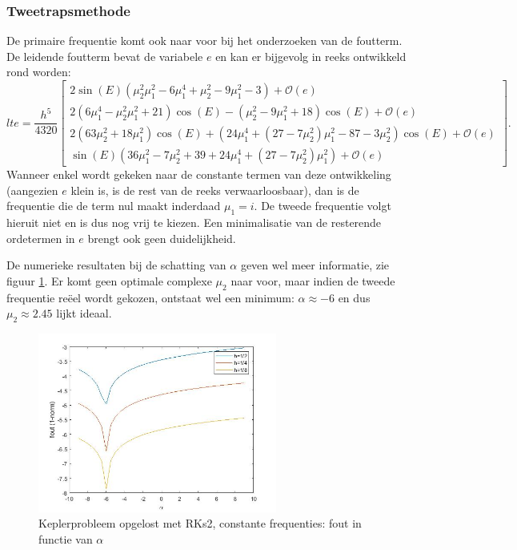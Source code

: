 \documentclass[12pt]{article}
\begin{document}
\subsubsection{Tweetrapsmethode}
De primaire frequentie komt ook naar voor bij het onderzoeken van de foutterm. De leidende foutterm bevat de variabele \(e\) en kan er bijgevolg in reeks ontwikkeld rond worden:
\begin{equation*}
    lte=\frac{h^5}{4320}
    \begin{bmatrix}
        2\sin(E)(\mu_2^2\mu_1^2-6\mu_1^4+\mu_2^2-9\mu_1^2-3)+\mathcal{O}(e) \\
        2(6\mu_1^4-\mu_2^2\mu_1^2+21)\cos(E)-(\mu_2^2-9\mu_1^2+18)\cos(E)+\mathcal{O}(e) \\
        2(63\mu_2^2+18\mu_1^2)\cos(E)+(24\mu_1^4+(27-7\mu_2^2)\mu_1^2-87-3\mu_2^2)\cos(E)+\mathcal{O}(e) \\
        \sin(E)(36\mu_1^2-7\mu_2^2+39+24\mu_1^4+(27-7\mu_2^2)\mu_1^2)+\mathcal{O}(e)
    \end{bmatrix}.
\end{equation*}
Wanneer enkel wordt gekeken naar de constante termen van deze ontwikkeling (aangezien \(e\) klein is, is de rest van de reeks verwaarloosbaar), dan is de frequentie die de term nul maakt inderdaad \(\mu_1=i\). De tweede frequentie volgt hieruit niet en is dus nog vrij te kiezen. Een minimalisatie van de resterende ordetermen in \(e\) brengt ook geen duidelijkheid. 

De numerieke resultaten bij de schatting van \(\alpha\) geven wel meer informatie, zie figuur \ref{fig:conskepleralphasrks2}. Er komt geen optimale complexe \(\mu_2\) naar voor, maar indien de tweede frequentie reëel wordt gekozen, ontstaat wel een minimum: \(\alpha\approx-6\) en dus \(\mu_2\approx2.45\) lijkt ideaal.
\begin{figure}[H]
    \centering
    \includegraphics[width=0.7\textwidth]{kepler_RKs2_fixed.jpg}
    \caption{Keplerprobleem opgelost met RKs2, constante frequenties: fout in functie van \(\alpha\)}
    \label{fig:conskepleralphasrks2}
\end{figure}
\end{document}
